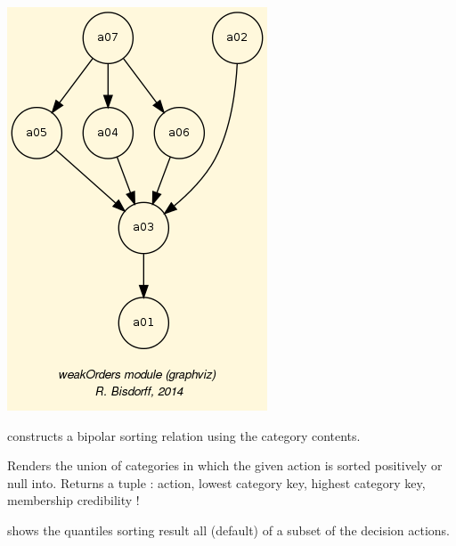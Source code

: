 \documentclass[letterpaper,10pt,english]{sphinxmanual}
\begin{document}
\begin{fulllineitems}
\includegraphics{quantilesSorting.png}

\begin{fulllineitems}
\label{techDoc:sortingDigraphs.QuantilesSortingDigraph.computeSortingRelation}
constructs a bipolar sorting relation using the category contents.

\end{fulllineitems}


\begin{fulllineitems}
\label{techDoc:sortingDigraphs.QuantilesSortingDigraph.showActionCategories}
Renders the union of categories in which the given action is sorted positively or null into.
Returns a tuple : action, lowest category key, highest category key, membership credibility !

\end{fulllineitems}


\begin{fulllineitems}
\label{techDoc:sortingDigraphs.QuantilesSortingDigraph.showActionsSortingResult}
shows the quantiles sorting result all (default) of a subset of the decision actions.


\end{fulllineitems}
\end{fulllineitems}
\end{document}

